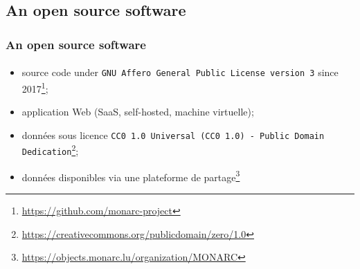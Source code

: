 \subsection{An open source software}
\begin{frame}
\frametitle{An open source software}
\framesubtitle{}
    \begin{itemize}
        \item source code under \texttt{GNU Affero General Public License version 3} since 2017\footnote{\url{https://github.com/monarc-project}};
        \item application Web (SaaS, self-hosted, machine virtuelle);
        \item données sous licence \texttt{CC0 1.0 Universal (CC0 1.0) - Public Domain Dedication}\footnote{\url{https://creativecommons.org/publicdomain/zero/1.0}};
        \item données disponibles via une plateforme de partage\footnote{\url{https://objects.monarc.lu/organization/MONARC}}
    \end{itemize}
\end{frame}
